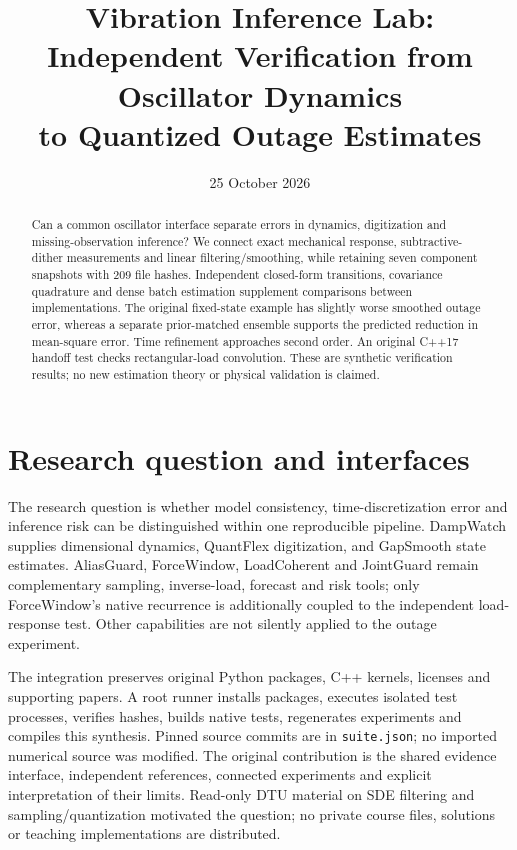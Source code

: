 \documentclass[10pt,a4paper]{article}
\title{Vibration Inference Lab:\\Independent Verification from Oscillator Dynamics\\to Quantized Outage Estimates}
\author{}
\date{25 October 2026}
\begin{document}
\maketitle
\begin{abstract}
Can a common oscillator interface separate errors in dynamics, digitization and missing-observation inference? We connect exact mechanical response, subtractive-dither measurements and linear filtering/smoothing, while retaining seven component snapshots with 209 file hashes. Independent closed-form transitions, covariance quadrature and dense batch estimation supplement comparisons between implementations. The original fixed-state example has slightly worse smoothed outage error, whereas a separate prior-matched ensemble supports the predicted reduction in mean-square error. Time refinement approaches second order. An original C++17 handoff test checks rectangular-load convolution. These are synthetic verification results; no new estimation theory or physical validation is claimed.
\end{abstract}
\section{Research question and interfaces}
The research question is whether model consistency, time-discretization error and inference risk can be distinguished within one reproducible pipeline. DampWatch supplies dimensional dynamics, QuantFlex digitization, and GapSmooth state estimates. AliasGuard, ForceWindow, LoadCoherent and JointGuard remain complementary sampling, inverse-load, forecast and risk tools; only ForceWindow's native recurrence is additionally coupled to the independent load-response test. Other capabilities are not silently applied to the outage experiment.

The integration preserves original Python packages, C++ kernels, licenses and supporting papers. A root runner installs packages, executes isolated test processes, verifies hashes, builds native tests, regenerates experiments and compiles this synthesis. Pinned source commits are in \texttt{suite.json}; no imported numerical source was modified. The original contribution is the shared evidence interface, independent references, connected experiments and explicit interpretation of their limits. Read-only DTU material on SDE filtering and sampling/quantization motivated the question; no private course files, solutions or teaching implementations are distributed.
\end{document}
